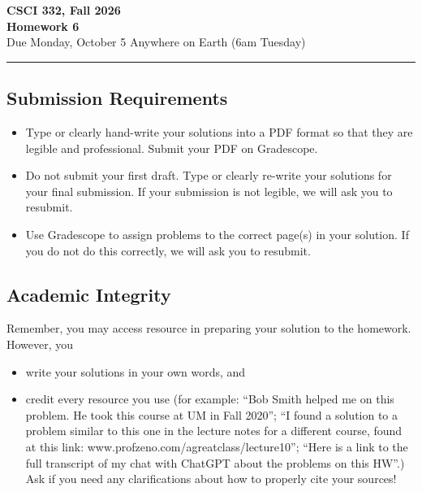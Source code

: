 \documentclass[11pt]{article}
\begin{document}
\begin{center}
\Large\textbf{CSCI 332, Fall 2026}%
\\
\LARGE\textbf{Homework 6}%
\\[0.5ex]
\large Due Monday, October 5 Anywhere on Earth (6am Tuesday)
\end{center}

\bigskip
\hrule
\bigskip

\subsection*{Submission Requirements}
\begin{itemize}
    \item Type or clearly hand-write your solutions into a PDF format so that they are legible and professional. Submit your PDF on Gradescope. 
    \item Do not submit your first draft. Type or clearly re-write your solutions for your final submission. If your submission is not legible, we will ask you to resubmit.
    \item Use Gradescope to assign problems to the correct page(s) in your solution. If you do not do this correctly, we will ask you to resubmit.
\end{itemize}

\subsection*{Academic Integrity}

Remember, you may access  resource in preparing your solution to the homework. However, you 
\begin{itemize}
    \item write your solutions in your own words, and
    \item credit every resource you use (for example: ``Bob Smith helped me on
    this problem. He took this course at UM in Fall 2020''; ``I found a solution
    to a problem similar to this one in the lecture notes for a different
    course, found at this link: www.profzeno.com/agreatclass/lecture10''; ``Here is a link to the full transcript of my chat with ChatGPT about the problems on this HW''.)
    Ask if you need any clarifications about how to properly cite your sources!
\end{itemize}




\newpage
    
\end{document}
